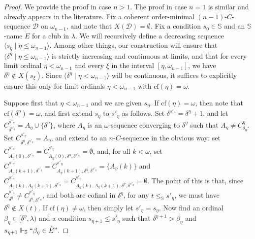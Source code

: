\documentclass{amsart}
\numberwithin{theorem}{section}
\theoremstyle{definition}
\newcommand{\cf}{\mathrm{cf}}
\newcommand{\bb}{\mathbb}
\newcommand{\mc}{\mathcal}
\begin{document}
\begin{proof}
  We provide the proof in case $n > 1$. The proof in case $n = 1$ is similar 
  and already appears in the literature. 
  Fix a coherent order-minimal $(n-1)$-$C$-sequence $\mc{D}$ on $\omega_{n-1}$, 
  and note that $X(\mc{D}) = \emptyset$. 
  Fix a condition $s_0 \in \bb{S}$ and an $\bb{S}$-name $\dot{E}$ for a club 
  in $\lambda$. We will recursively define a decreasing sequence $\langle s_\eta \mid 
  \eta \leq \omega_{n-1} \rangle$. Among other things, our construction will 
  ensure that $\langle \delta^\eta \mid \eta \leq \omega_{n-1} \rangle$ is 
  strictly increasing and continuous at limits, and that for every limit 
  ordinal $\eta < \omega_{n-1}$ and every $\xi$ in the interval $[\eta,\omega_{n-1}]$, 
  we have $\delta^\eta \notin X(s_\xi)$. Since $\langle \delta^\eta \mid \eta 
  < \omega_{n-1} \rangle$ will be continuous, it suffices to explicitly ensure 
  this only for limit ordinals $\eta < \omega_{n-1}$ with $\cf(\eta) = \omega$.
  
  Suppose first that $\eta < \omega_{n-1}$ and we are given $s_\eta$. 
  If $\cf(\eta) = \omega$, then note that $\cf(\delta^\eta) = \omega$, and first 
  extend $s_\eta$ to $s'_\eta$ as follows. Set $\delta^{s'_\eta} = \delta^\eta + 1$, 
  and let $C^{s'_\eta}_{\delta^{s'_\eta}} = A_\eta \cup \{\delta^\eta\}$, where 
  $A_\eta$ is an $\omega$-sequence converging to $\delta^\eta$ such that 
  $A_\eta \neq C^\eta_{\delta_\eta}$. Set $C^{s'_\eta}_{\delta^\eta,\delta^{s'_\eta}} 
  = A_\eta$, and extend to an $n$-$C$-sequence in the obvious 
  way: set $C^{s'_\eta}_{A_\eta(0), \delta^{s'_\eta}} = C^{s'_\eta}_{A_\eta(0), 
  \delta^\eta,\delta^{s'_\eta}} = \emptyset$, and, for all $k < \omega$, set 
  $C^{s'_\eta}_{A_\eta(k+1),\delta^{s'_\eta}} = C^{s'_\eta}_{A_\eta(k+1),\delta^\eta, 
  \delta^{s'_\eta}} = \{A_\eta(k)\}$ and 
  $C^{s'_\eta}_{A_\eta(k),A_\eta(k+1),\delta^{s'_\eta}} = 
  C^{s'_\eta}_{A_\eta(k),A_\eta(k+1),\delta^\eta,\delta^{s'_\eta}} = \emptyset$. 
  The point of this is that, since $C^{s'_\eta}_{\delta^\eta} \neq 
  C^{s'_\eta}_{\delta^\eta,\delta^{s'_\eta}}$, and both are cofinal in 
  $\delta^\eta$, for any $t \leq_{\bb{S}} s'_\eta$, we must have 
  $\delta^\eta \notin X(t)$. If $\cf(\eta) \neq \omega$, then simply let 
  $s'_\eta = s_\eta$. Now find an ordinal $\beta_\eta \in [\delta^\eta,\lambda)$ 
  and a condition $s_{\eta+1} \leq s'_\eta$ such that $\delta^{\eta+1} > \beta_\eta$ 
  and $s_{\eta+1} \Vdash_{\bb{S}}``\beta_\eta \in \dot{E}"$.
  

\end{proof}
\end{document}

